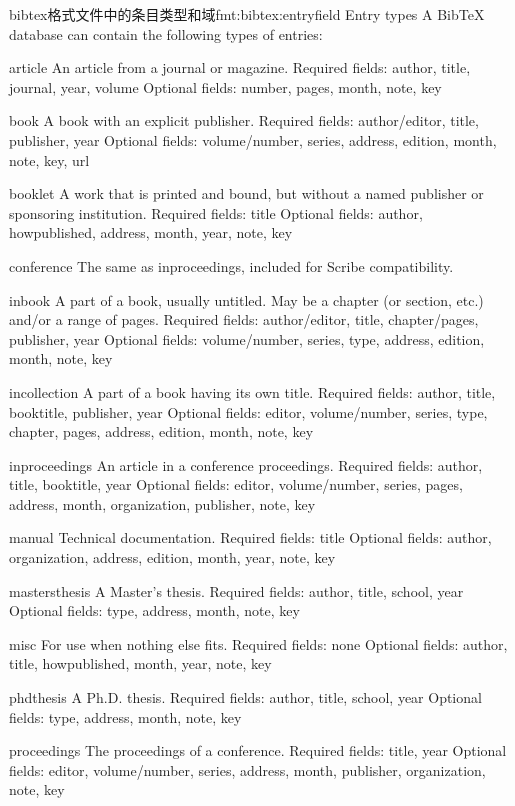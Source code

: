 \documentclass[twoside]{article} %
\begin{document}
\begin{codetex}{bibtex格式文件中的条目类型和域}{fmt:bibtex:entryfield}
Entry types
A BibTeX database can contain the following types of entries:

article
An article from a journal or magazine.
Required fields: author, title, journal, year, volume
Optional fields: number, pages, month, note, key

book
A book with an explicit publisher.
Required fields: author/editor, title, publisher, year
Optional fields: volume/number, series, address, edition, month, note, key, url

booklet
A work that is printed and bound, but without a named publisher or sponsoring institution.
Required fields: title
Optional fields: author, howpublished, address, month, year, note, key

conference
The same as inproceedings, included for Scribe compatibility.

inbook
A part of a book, usually untitled. May be a chapter (or section, etc.) and/or a range of pages.
Required fields: author/editor, title, chapter/pages, publisher, year
Optional fields: volume/number, series, type, address, edition, month, note, key

incollection
A part of a book having its own title.
Required fields: author, title, booktitle, publisher, year
Optional fields: editor, volume/number, series, type, chapter, pages, address, edition, month, note, key

inproceedings
An article in a conference proceedings.
Required fields: author, title, booktitle, year
Optional fields: editor, volume/number, series, pages, address, month, organization, publisher, note, key

manual
Technical documentation.
Required fields: title
Optional fields: author, organization, address, edition, month, year, note, key

mastersthesis
A Master's thesis.
Required fields: author, title, school, year
Optional fields: type, address, month, note, key

misc
For use when nothing else fits.
Required fields: none
Optional fields: author, title, howpublished, month, year, note, key

phdthesis
A Ph.D. thesis.
Required fields: author, title, school, year
Optional fields: type, address, month, note, key

proceedings
The proceedings of a conference.
Required fields: title, year
Optional fields: editor, volume/number, series, address, month, publisher, organization, note, key


\end{codetex}
\end{document}
